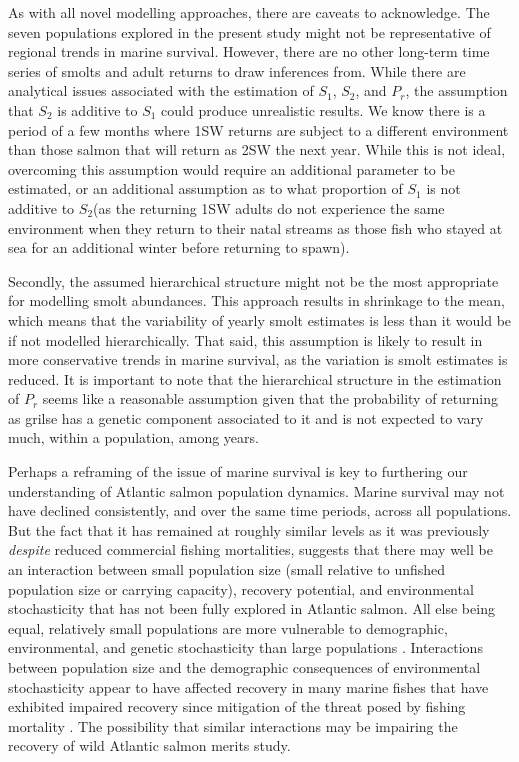 \documentclass[12pt]{article}
\newcommand{\So}{$S_{1}$\xspace}
\newcommand{\St}{$S_{2}$\xspace}
\newcommand{\Pg}{$P_r$\xspace}
\begin{document}
As with all novel modelling approaches, there are caveats to acknowledge.
The seven populations explored in the present study might not be representative
of regional trends in marine survival. However, there are no other
long-term time series of smolts and adult returns to draw inferences from.
While there are analytical issues associated with the estimation of \So, \St, and \Pg,
the assumption that \St is additive to \So could produce unrealistic results.
We know there is a period of a few months where 1SW
returns are subject to a different environment than those salmon that will
return as 2SW the next year. 
While this is not ideal,
overcoming this assumption would require an additional parameter to be
estimated, or an additional assumption as to what proportion of \So is not
additive to \St (as the returning 1SW adults do not experience the same
environment when they return to their natal streams as those fish who stayed
at sea for an additional winter before returning to spawn).

Secondly, the assumed hierarchical structure might not be the most appropriate
for modelling smolt abundances. This approach results in shrinkage to the
mean, which means that the variability of yearly smolt estimates is less than
it would be if not modelled hierarchically. 
That said, this assumption is likely to result in more conservative trends in marine survival, as the
variation is smolt estimates is reduced.
It is important to note that the hierarchical structure in the estimation of
\Pg seems like a reasonable assumption given that the probability of returning
as grilse has a genetic component associated to it \citep{Aykanat2019} and is
not expected to vary much, within a population, among years.

Perhaps a reframing of the issue of marine survival is key to furthering our
understanding of Atlantic salmon population dynamics. Marine survival may not
have declined consistently, and over the same time periods, across all
populations. 
But the fact that it has remained at roughly similar levels as it was
previously \emph{despite} reduced commercial fishing mortalities, suggests
that there may well be an interaction between small population size (small
relative to unfished population size or carrying capacity), recovery
potential, and environmental stochasticity that has not been fully explored in
Atlantic salmon. 
All else being equal, relatively small populations are more vulnerable to
demographic, environmental, and genetic stochasticity than large populations
\citep{Lande1993, Hutchings2015}. Interactions between population size and the
demographic consequences of environmental stochasticity appear to have
affected recovery in many marine fishes that have exhibited impaired recovery
since mitigation of the threat posed by fishing mortality
\citep{Hutchings2017, Hutchings2020}. The possibility that similar
interactions may be impairing the recovery of wild Atlantic salmon merits
study.
\end{document}
